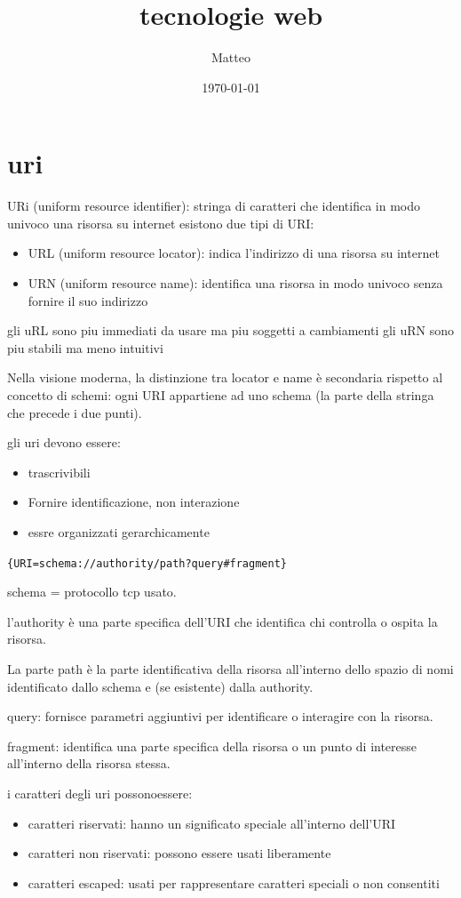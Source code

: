 \documentclass[12pt]{article}
\title{tecnologie web}
\author{Matteo}
\date{\today}
\begin{document}
\maketitle
\section{uri}


URi (uniform resource identifier): stringa di caratteri che identifica in modo univoco una risorsa su internet
esistono due tipi di URI:
\begin{itemize}
    \item URL (uniform resource locator): indica l'indirizzo di una risorsa su internet
    \item URN (uniform resource name): identifica una risorsa in modo univoco senza fornire il suo indirizzo
\end{itemize}

gli uRL sono piu immediati da usare ma piu soggetti a cambiamenti
gli uRN sono piu stabili ma meno intuitivi

Nella visione moderna, la distinzione tra locator e name è
secondaria rispetto al concetto di schemi: ogni URI appartiene ad
uno schema (la parte della stringa che precede i due punti).


gli uri devono essere:
\begin{itemize}
\item trascrivibili
\item Fornire identificazione, non interazione
\item essre organizzati gerarchicamente
\end{itemize}


\texttt{\{URI=schema://authority/path?query\#fragment\}}

schema = protocollo tcp usato.

l’authority è una parte specifica dell’URI che identifica chi controlla o ospita la risorsa.

La parte path è la parte identificativa della risorsa
all’interno dello spazio di nomi identificato dallo schema e
(se esistente) dalla authority.

query: fornisce parametri aggiuntivi per identificare o
interagire con la risorsa.

fragment: identifica una parte specifica della risorsa
o un punto di interesse all’interno della risorsa stessa.

i caratteri degli uri possonoessere:
\begin{itemize}
    \item caratteri riservati: hanno un significato speciale all'interno dell'URI
    \item caratteri non riservati: possono essere usati liberamente
    \item caratteri escaped: usati per rappresentare caratteri speciali o non consentiti
\end{itemize}
\end{document}
